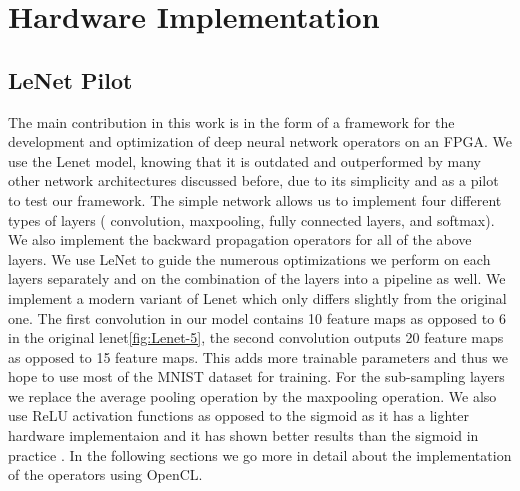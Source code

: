 
\chapter{Hardware Implementation} %

\label{Chapter3} %


\section{LeNet Pilot}

The main contribution in this work is in the form of a framework for the development and optimization of deep neural network operators on an FPGA. We use the Lenet \cite{lenet} model, knowing that it is outdated and outperformed by many other network architectures discussed before, due to its simplicity and as a pilot to test our framework. The simple network allows us to implement four different types of layers ( convolution, maxpooling, fully connected layers, and softmax). We also implement the backward propagation operators for all of the above layers.  We use LeNet to guide the numerous optimizations we perform on each layers separately and on the combination of the layers into a pipeline as well. We implement a modern variant of Lenet which only differs slightly from the original one. The first convolution in our model contains 10 feature maps as opposed to 6 in the original lenet\ref{fig:Lenet-5}, the second convolution outputs 20 feature maps as opposed to 15 feature maps. This adds more trainable parameters and thus we hope to use most of the MNIST dataset for training. For the sub-sampling layers we replace the average pooling operation by the maxpooling operation. We also use ReLU activation functions as opposed to the sigmoid as it has a lighter hardware implementaion and it has shown better results than the sigmoid in practice \cite{alexnet}. In the following sections we go more in detail about the implementation of the operators using OpenCL. 

